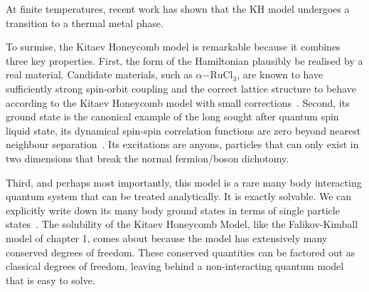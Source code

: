 At finite temperatures, recent work has shown that the KH model undergoes a transition to a thermal metal phase.

To surmise, the Kitaev Honeycomb model is remarkable because it combines three key properties. First, the form of the Hamiltonian plausibly be realised by a real material. Candidate materials, such as \(\alpha\mathrm{-RuCl}_3\), are known to have sufficiently strong spin-orbit coupling and the correct lattice structure to behave according to the Kitaev Honeycomb model with small corrections~\autocite{banerjeeProximateKitaevQuantum2016,TrebstPhysRep2022}. Second, its ground state is the canonical example of the long sought after quantum spin liquid state, its dynamical spin-spin correlation functions are zero beyond nearest neighbour separation~\autocite{baskaranExactResultsSpin2007}. Its excitations are anyons, particles that can only exist in two dimensions that break the normal fermion/boson dichotomy.

Third, and perhaps most importantly, this model is a rare many body interacting quantum system that can be treated analytically. It is exactly solvable. We can explicitly write down its many body ground states in terms of single particle states~\autocite{kitaevAnyonsExactlySolved2006}. The solubility of the Kitaev Honeycomb Model, like the Falikov-Kimball model of chapter 1, comes about because the model has extensively many conserved degrees of freedom. These conserved quantities can be factored out as classical degrees of freedom, leaving behind a non-interacting quantum model that is easy to solve.
